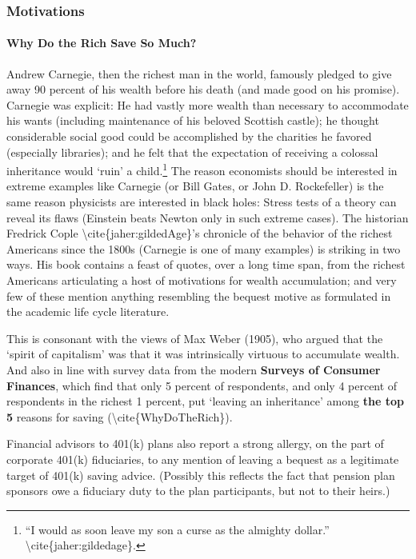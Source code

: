\documentclass{article}
\begin{document}
\subsubsection{Motivations}

\paragraph{Why Do the Rich Save So Much?}

Andrew Carnegie, then the richest man in the world, famously pledged to give away 90 percent of his wealth before his death (and made good on his promise). Carnegie was explicit: He had vastly more wealth than necessary to accommodate his wants (including maintenance of his beloved Scottish castle); he thought considerable social good could be accomplished by the charities he favored (especially libraries); and he felt that the expectation of receiving a colossal inheritance would `ruin' a child.\footnote{``I would as soon leave my son a curse as the almighty dollar.'' {\textbackslash}cite\{jaher:gildedage\}.} The reason economists should be interested in extreme examples like Carnegie (or Bill Gates, or John D. Rockefeller) is the same reason physicists are interested in black holes: Stress tests of a theory can reveal its flaws (Einstein beats Newton only in such extreme cases). The historian Fredrick Cople {\textbackslash}cite\{jaher:gildedAge\}'s chronicle of the behavior of the richest Americans since the 1800s (Carnegie is one of many examples) is striking in two ways. His book contains a feast of quotes, over a long time span, from the richest Americans articulating a host of motivations for wealth accumulation; and very few of these mention anything resembling the bequest motive as formulated in the academic life cycle literature.

This is consonant with the views of Max Weber (1905), who argued that the `spirit of capitalism' was that it was intrinsically virtuous to accumulate wealth. And also in line with survey data from the modern \textbf{Surveys of Consumer Finances}, which find that only 5 percent of respondents, and only 4 percent of respondents in the richest 1 percent, put `leaving an inheritance' among \textbf{the top 5} reasons for saving ({\textbackslash}cite\{WhyDoTheRich\}).

Financial advisors to 401(k) plans also report a strong allergy, on the part of corporate 401(k) fiduciaries, to any mention of leaving a bequest as a legitimate target of 401(k) saving advice. (Possibly this reflects the fact that pension plan sponsors owe a fiduciary duty to the plan participants, but not to their heirs.)
\end{document}
